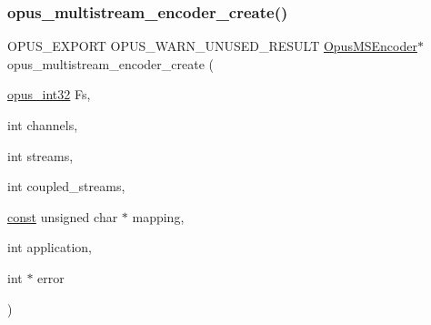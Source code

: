 \subsubsection{\texorpdfstring{opus\+\_\+multistream\+\_\+encoder\+\_\+create()}{opus\_multistream\_encoder\_create()}}
{\footnotesize\ttfamily O\+P\+U\+S\+\_\+\+E\+X\+P\+O\+RT O\+P\+U\+S\+\_\+\+W\+A\+R\+N\+\_\+\+U\+N\+U\+S\+E\+D\+\_\+\+R\+E\+S\+U\+LT \hyperlink{group__opus__multistream_gae5826674d142fc873ebc1d781c507dd7}{Opus\+M\+S\+Encoder}$\ast$ opus\+\_\+multistream\+\_\+encoder\+\_\+create (\begin{DoxyParamCaption}\item[{\hyperlink{opus__types_8h_aa4d309d6f80b99dbabebc8f98879ab9a}{opus\+\_\+int32}}]{Fs,  }\item[{int}]{channels,  }\item[{int}]{streams,  }\item[{int}]{coupled\+\_\+streams,  }\item[{\hyperlink{zconf_8h_a2c212835823e3c54a8ab6d95c652660e}{const} unsigned char $\ast$}]{mapping,  }\item[{int}]{application,  }\item[{int $\ast$}]{error }\end{DoxyParamCaption})}

